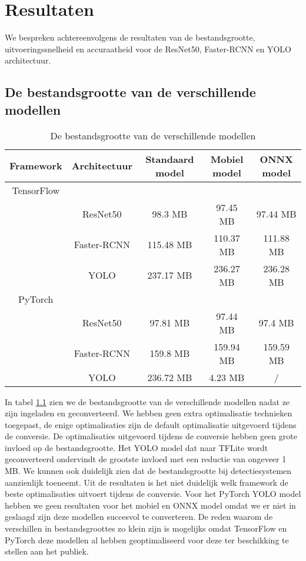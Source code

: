 \chapter{Resultaten}
We bespreken achtereenvolgens de resultaten van de bestandsgrootte, uitvoeringssnelheid en accuraatheid voor de ResNet50, Faster-RCNN en YOLO architectuur.

\section{De bestandsgrootte van de verschillende modellen} \label{res_size}

\begin{table}[!ht]
    \caption{De bestandsgrootte van de verschillende modellen}
\begin{tabular}{ccccc}
    \hline
    Framework & Architectuur & Standaard model & Mobiel model & ONNX model \\
    \hline
    TensorFlow & & & \\
     & ResNet50 & 98.3 MB & 97.45 MB & 97.44 MB \\
     & Faster-RCNN & 115.48 MB & 110.37 MB & 111.88 MB \\
     & YOLO & 237.17 MB & 236.27 MB & 236.28 MB \\
    PyTorch & & & \\
     & ResNet50 & 97.81 MB & 97.44 MB & 97.4 MB \\
     & Faster-RCNN & 159.8 MB & 159.94 MB & 159.59 MB \\
     & YOLO & 236.72 MB & 4.23 MB & / \\
    \hline
\end{tabular}
\label{tab:size}
\end{table}

In tabel \ref{tab:size} zien we de bestandsgrootte van de verschillende modellen nadat ze zijn ingeladen en geconverteerd.
We hebben geen extra optimalisatie technieken toegepast, de enige optimalisaties zijn de default optimalisatie uitgevoerd tijdens de conversie.
De optimalisaties uitgevoerd tijdens de conversie hebben geen grote invloed op de bestandsgrootte.
Het YOLO model dat naar TFLite wordt geconverteerd ondervindt de grootste invloed met een reductie van ongeveer 1 MB.
We kunnen ook duidelijk zien dat de bestandsgrootte bij detectiesystemen aanzienlijk toeneemt.
Uit de resultaten is het niet duidelijk welk framework de beste optimalisaties uitvoert tijdens de conversie.
Voor het PyTorch YOLO model hebben we geen resultaten voor het mobiel en ONNX model omdat we er niet in geslaagd zijn deze modellen succesvol te converteren.
De reden waarom de verschillen in bestandsgroottes zo klein zijn is mogelijks omdat TensorFlow en PyTorch deze modellen al hebben geoptimaliseerd voor deze ter beschikking te stellen aan het publiek.

